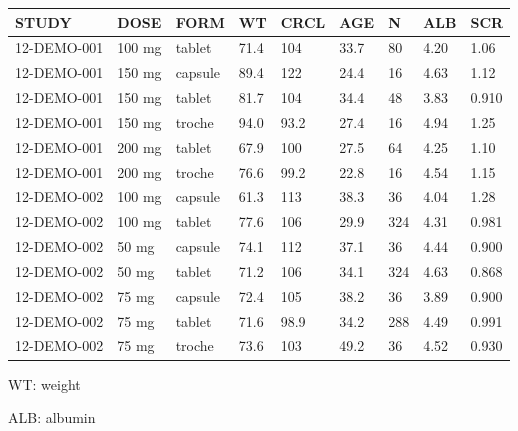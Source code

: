 {\def\arraystretch{1.4}\tabcolsep=5pt
\begin{threeparttable}
\begin{tabular}[h]{lllllllll}
\hline
STUDY & DOSE & FORM & WT & CRCL & AGE & N & ALB & SCR \\
\hline
12-DEMO-001 & 100 mg & tablet & 71.4 & 104 & 33.7 & 80 & 4.20 & 1.06 \\
12-DEMO-001 & 150 mg & capsule & 89.4 & 122 & 24.4 & 16 & 4.63 & 1.12 \\
12-DEMO-001 & 150 mg & tablet & 81.7 & 104 & 34.4 & 48 & 3.83 & 0.910 \\
12-DEMO-001 & 150 mg & troche & 94.0 & 93.2 & 27.4 & 16 & 4.94 & 1.25 \\
12-DEMO-001 & 200 mg & tablet & 67.9 & 100 & 27.5 & 64 & 4.25 & 1.10 \\
12-DEMO-001 & 200 mg & troche & 76.6 & 99.2 & 22.8 & 16 & 4.54 & 1.15 \\
12-DEMO-002 & 100 mg & capsule & 61.3 & 113 & 38.3 & 36 & 4.04 & 1.28 \\
12-DEMO-002 & 100 mg & tablet & 77.6 & 106 & 29.9 & 324 & 4.31 & 0.981 \\
12-DEMO-002 & 50 mg & capsule & 74.1 & 112 & 37.1 & 36 & 4.44 & 0.900 \\
12-DEMO-002 & 50 mg & tablet & 71.2 & 106 & 34.1 & 324 & 4.63 & 0.868 \\
12-DEMO-002 & 75 mg & capsule & 72.4 & 105 & 38.2 & 36 & 3.89 & 0.900 \\
12-DEMO-002 & 75 mg & tablet & 71.6 & 98.9 & 34.2 & 288 & 4.49 & 0.991 \\
12-DEMO-002 & 75 mg & troche & 73.6 & 103 & 49.2 & 36 & 4.52 & 0.930 \\
\hline
\end{tabular}
\begin{tablenotes}[flushleft]
\item WT: weight
\item ALB: albumin
\end{tablenotes}
\end{threeparttable}
}

